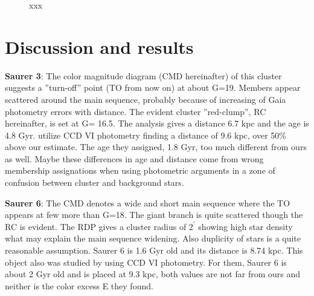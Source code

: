 \documentclass[draft]{aa}
\begin{document}
  \begin{figure}
   \caption{xxx}
   \label{fig:BER29_fpars}
  \end{figure}





\section{Discussion and results}
 \label{sec:results}

\textbf{Saurer 3}:
The color magnitude diagram (CMD hereinafter) of this cluster suggests a ''turn-off'' point (TO from now on) at about G=19. Members appear scattered around the main sequence, probably because of increasing of Gaia photometry errors with distance. The evident cluster ''red-clump'', RC hereinafter, is set at G= 16.5. The analysis gives a distance 6.7 kpc and the age is 4.8 Gyr. \cite{2003MNRAS.346...18C} utilize CCD VI photometry finding a distance of 9.6 kpc, over 50\% above our estimate. The age they assigned, 1.8 Gyr, too much different from ours as well. Maybe these differences in age and distance come from wrong membership assignations when using photometric arguments in a zone of confusion between cluster and background stars. 

\textbf{Saurer 6}:
The CMD denotes a wide and short main sequence where the TO appears at few more than G=18. The giant branch is quite scattered though the RC is evident. The RDP gives a cluster radius of $2^{\prime}$ showing high star density what may explain the main sequence widening. Also duplicity of stars is a quite reasonable assumption. Saurer 6 is 1.6 Gyr old and its distance is 8.74 kpc. This object also was studied by \cite{2002AJ....123.2552F} using CCD VI photometry. For them, Saurer 6 is about 2 Gyr old and is placed at 9.3 kpc, both values are not far from ours and neither is the color excess E they found.
\end{document}
